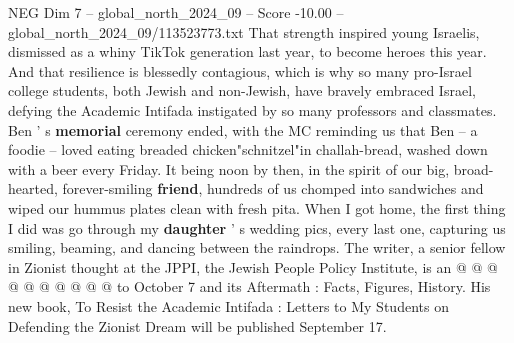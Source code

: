 \begin{textsample}{NEG Dim 7 – global\_north\_2024\_09 – Score -10.00 – global\_north\_2024\_09/113523773.txt}
That strength inspired young Israelis, dismissed as a whiny TikTok generation last year, to become heroes this year.
And that resilience is blessedly contagious, which is why so many pro-Israel college students, both Jewish and non-Jewish, have bravely embraced Israel, defying the Academic Intifada instigated by so many professors and classmates.
Ben ' s \textbf{memorial} ceremony ended, with the MC reminding us that Ben -- a foodie -- loved eating breaded chicken"schnitzel"in challah-bread, washed down with a beer every Friday.
It being noon by then, in the spirit of our big, broad-hearted, forever-smiling \textbf{friend}, hundreds of us chomped into sandwiches and wiped our hummus plates clean with fresh pita.
When I got home, the first thing I did was go through my \textbf{daughter} ' s wedding pics, every last one, capturing us smiling, beaming, and dancing between the raindrops.
The writer, a senior fellow in Zionist thought at the JPPI, the Jewish People Policy Institute, is an @ @ @ @ @ @ @ @ @ @ to October 7 and its Aftermath : Facts, Figures, History.
His new book, To Resist the Academic Intifada : Letters to My Students on Defending the Zionist Dream will be published September 17.

\end{textsample}
